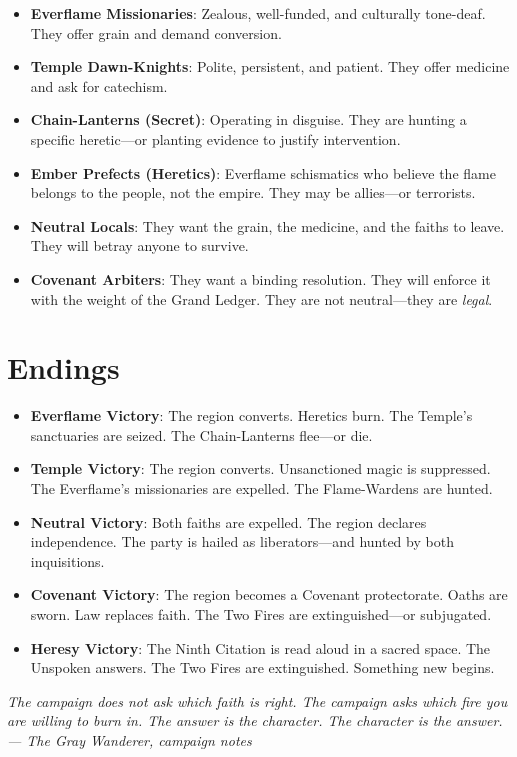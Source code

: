 \documentclass{book}
\newcommand{\citation}[1]{\textcolor{marginalia}{\small\textit{#1}}}
\begin{document}
\begin{itemize}
\item \textbf{Everflame Missionaries}: Zealous, well-funded, and culturally tone-deaf. They offer grain and demand conversion.
\item \textbf{Temple Dawn-Knights}: Polite, persistent, and patient. They offer medicine and ask for catechism.
\item \textbf{Chain-Lanterns (Secret)}: Operating in disguise. They are hunting a specific heretic---or planting evidence to justify intervention.
\item \textbf{Ember Prefects (Heretics)}: Everflame schismatics who believe the flame belongs to the people, not the empire. They may be allies---or terrorists.
\item \textbf{Neutral Locals}: They want the grain, the medicine, and the faiths to leave. They will betray anyone to survive.
\item \textbf{Covenant Arbiters}: They want a binding resolution. They will enforce it with the weight of the Grand Ledger. They are not neutral---they are \textit{legal}.
\end{itemize}

\section{Endings}

\begin{itemize}
\item \textbf{Everflame Victory}: The region converts. Heretics burn. The Temple's sanctuaries are seized. The Chain-Lanterns flee---or die.
\item \textbf{Temple Victory}: The region converts. Unsanctioned magic is suppressed. The Everflame's missionaries are expelled. The Flame-Wardens are hunted.
\item \textbf{Neutral Victory}: Both faiths are expelled. The region declares independence. The party is hailed as liberators---and hunted by both inquisitions.
\item \textbf{Covenant Victory}: The region becomes a Covenant protectorate. Oaths are sworn. Law replaces faith. The Two Fires are extinguished---or subjugated.
\item \textbf{Heresy Victory}: The Ninth Citation is read aloud in a sacred space. The Unspoken answers. The Two Fires are extinguished. Something new begins.
\end{itemize}

\citation{The campaign does not ask which faith is right. The campaign asks which fire you are willing to burn in. The answer is the character. The character is the answer. --- The Gray Wanderer, campaign notes}
\end{document}
